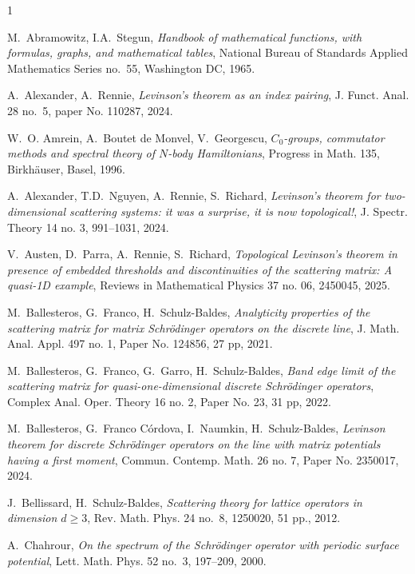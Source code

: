 \documentclass[11pt]{article}
\begin{document}
\begin{thebibliography}{1}

M.~Abramowitz, I.A.~Stegun,
\emph{Handbook of mathematical functions, with formulas, graphs, and mathematical tables},
National Bureau of Standards Applied Mathematics Series no.~55,
Washington DC, 1965.

A.~Alexander, A.~Rennie,
\emph{Levinson's theorem as an index pairing},
J. Funct. Anal.  28 no.~5, paper No. 110287, 2024.

W.~O. Amrein, A.~Boutet de Monvel, V.~Georgescu,
\emph{${C_0}$-groups, commutator methods and spectral theory of
${N}$-body Hamiltonians},
Progress in Math. 135, Birkh\"auser, Basel, 1996.

A.~Alexander, T.D.~Nguyen, A.~Rennie, S.~Richard,
\emph{Levinson's theorem for two-dimensional scattering systems: it was a surprise, it is now topological!},
J. Spectr. Theory 14 no. 3, 991--1031, 2024.

V.~Austen, D.~Parra, A.~Rennie, S.~Richard,
\emph{Topological Levinson’s theorem in presence of embedded thresholds and discontinuities of the scattering matrix: A quasi-1D example},
Reviews in Mathematical Physics 37 no. 06, 2450045, 2025.

M.~Ballesteros, G.~Franco, H.~Schulz-Baldes,
\emph{Analyticity properties of the scattering matrix for matrix  Schr\"odinger operators on the discrete line}, J. Math. Anal. Appl. 497 no. 1, Paper No. 124856, 27 pp, 2021.

M.~Ballesteros, G.~Franco, G.~Garro, H.~Schulz-Baldes, 
\emph{Band edge limit of the scattering matrix for quasi-one-dimensional discrete Schr\"odinger operators},
Complex Anal. Oper. Theory 16 no. 2, Paper No. 23, 31 pp, 2022.

M.~Ballesteros, G.~Franco C\'ordova, I.~Naumkin, H.~Schulz-Baldes,
\emph{Levinson theorem for discrete Schr\"odinger operators on the line with matrix potentials having a first moment},
Commun. Contemp. Math. 26 no. 7, Paper No. 2350017, 2024.

J.~Bellissard, H.~Schulz-Baldes,
\emph{Scattering theory for lattice operators in dimension $d\geq3$}, 
Rev. Math. Phys. 24 no.~8, 1250020, 51 pp., 2012.

A.~Chahrour,
\emph{On the spectrum of the Schr\"odinger operator with periodic surface potential},
Lett. Math. Phys. 52 no.~3, 197--209, 2000.


\end{thebibliography}
\end{document}
